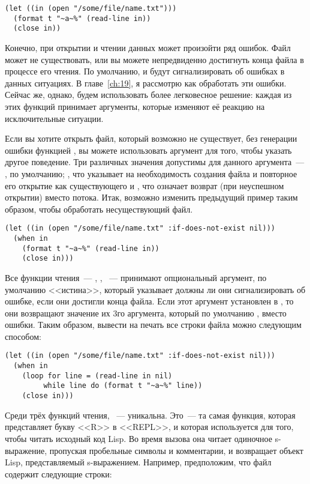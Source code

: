 \begin{lstlisting}
(let ((in (open "/some/file/name.txt")))
  (format t "~a~%" (read-line in))
  (close in))
\end{lstlisting}

Конечно, при открытии и чтении данных может произойти ряд ошибок. Файл может не
существовать, или вы можете непредвиденно достигнуть конца файла в процессе его чтения. По
умолчанию,  и  будут сигнализировать об ошибках в данных
ситуациях. В главе~\ref{ch:19}, я рассмотрю как обработать эти ошибки. Сейчас же, однако, будем
использовать более легковесное решение: каждая из этих функций принимает аргументы,
которые изменяют её реакцию на исключительные ситуации.

Если вы хотите открыть файл, который возможно не существует, без генерации ошибки
функцией , вы можете использовать аргумент  для того,
чтобы указать другое поведение. Три различных значения допустимы для данного аргумента~---
, по умолчанию; , что указывает на необходимость создания файла
и повторное его открытие как существующего и , что означает возврат 
(при неуспешном открытии) вместо потока. Итак, возможно изменить предыдущий пример таким
образом, чтобы обработать несуществующий файл.

\begin{lstlisting}
(let ((in (open "/some/file/name.txt" :if-does-not-exist nil)))
  (when in
    (format t "~a~%" (read-line in))
    (close in)))
\end{lstlisting}

Все функции чтения~--- , , ~--- принимают
опциональный аргумент, по умолчанию <<истина>>, который указывает должны ли они
сигнализировать об ошибке, если они достигли конца файла. Если этот аргумент установлен в
, то они возвращают значение их 3го аргумента, который по умолчанию ,
вместо ошибки. Таким образом, вывести на печать все строки файла можно следующим способом:

\begin{lstlisting}
(let ((in (open "/some/file/name.txt" :if-does-not-exist nil)))
  (when in
    (loop for line = (read-line in nil)
         while line do (format t "~a~%" line))
    (close in)))
\end{lstlisting}

Среди трёх функций чтения, ~--- уникальна. Это~--- та самая функция, которая
представляет букву <<R>> в <<REPL>>, и которая используется для того, чтобы читать исходный
код Lisp. Во время вызова она читает одиночное s-выражение, пропуская пробельные символы и
комментарии, и возвращает объект Lisp, представляемый s-выражением. Например, предположим,
что файл  содержит следующие строки:

